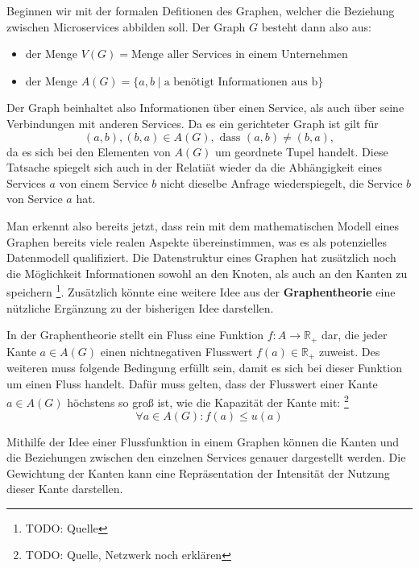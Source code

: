 \documentclass[
	12pt,
	BCOR=5mm,
	DIV=12,
	headinclude=on,
	footinclude=off,
	parskip=half,
	bibliography=totoc,
	listof=entryprefix,
	toc=listof,
	numbers=noenddot,
	plainfootsepline
]{scrreprt}
\begin{document}
\begin{example}
	Beginnen wir mit der formalen Defitionen des Graphen, welcher die Beziehung zwischen Microservices abbilden soll. Der Graph $G$ besteht dann also aus: 
	\begin{itemize}
		\item der Menge $V(G)=\text{Menge aller Services in einem Unternehmen}$
		\item der Menge $A(G)=\{a,b \mid \text{a benötigt Informationen aus b}\}$
	\end{itemize}
	Der Graph beinhaltet also Informationen über einen Service, als auch über seine Verbindungen mit anderen Services. Da es ein gerichteter Graph ist gilt für $$(a,b), (b,a) \in A(G),\text{ dass }(a,b) \neq (b,a),$$ da es sich bei den Elementen von $A(G)$ um geordnete Tupel handelt. Diese Tatsache spiegelt sich auch in der Relatiät wieder da die Abhängigkeit eines Services $a$ von einem Service $b$ nicht dieselbe Anfrage wiederspiegelt, die Service $b$ von Service $a$ hat.
\end{example}

Man erkennt also bereits jetzt, dass rein mit dem mathematischen Modell eines Graphen bereits viele realen Aspekte übereinstimmen, was es als potenzielles Datenmodell qualifiziert. Die Datenstruktur eines Graphen hat zusätzlich noch die Möglichkeit Informationen sowohl an den Knoten, als auch an den Kanten zu speichern \footnote{TODO: Quelle}. Zusätzlich könnte eine weitere Idee aus der \textbf{Graphentheorie} eine nützliche Ergänzung zu der bisherigen Idee darstellen.

\begin{definition}[Fluss]
	In der Graphentheorie stellt ein Fluss eine Funktion $f: A \rightarrow \mathbb{R_+}$ dar, die jeder Kante $a \in A(G)$ einen nichtnegativen Flusswert $f(a) \in \mathbb{R_+}$ zuweist. Des weiteren muss folgende Bedingung erfüllt sein, damit es sich bei dieser Funktion um einen Fluss handelt. Dafür muss gelten, dass der Flusswert einer Kante $a \in A(G)$ höchstens so groß ist, wie die Kapazität der Kante mit: \footnote{TODO: Quelle, Netzwerk noch erklären} $$\forall a \in A(G): f(a) \leq u(a)$$
\end{definition}

Mithilfe der Idee einer Flussfunktion in einem Graphen können die Kanten und die Beziehungen zwischen den einzelnen Services genauer dargestellt werden. Die Gewichtung der Kanten kann eine Repräsentation der Intensität der Nutzung dieser Kante darstellen.
\end{document}
